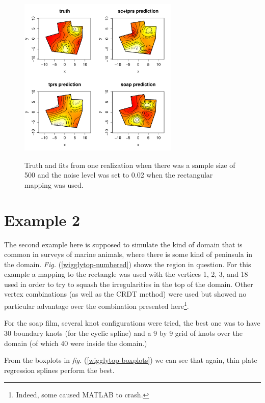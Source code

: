 \documentclass[a4paper,10pt]{amsart}
\newcommand{\fig}[1]{\emph{fig.} (\ref{#1})}
\newcommand{\Fig}[1]{\emph{Fig.} (\ref{#1})}
\begin{document}
\begin{figure}[tbp]
\centering
\includegraphics[width=3in]{figs-otherdomains/fig9-rect-real.pdf} \\
\caption{Truth and fits from one realization when there was a sample size of 500 and the noise level was set to 0.02 when the rectangular mapping was used. }
\label{fig9-rect-real}
\end{figure}




\section{Example 2}

The second example here is supposed to simulate the kind of domain that is common in surveys of marine animals, where there is some kind of peninsula in the domain. \Fig{wigglytop-numbered} shows the region in question. For this example a mapping to the rectangle was used with the vertices 1, 2, 3, and 18 used in order to try to squash the irregularities in the top of the domain. Other vertex combinations (as well as the CRDT method) were used but showed no particular advantage over the combination presented here\footnote{Indeed, some caused MATLAB to crash.}.

For the soap film, several knot configurations were tried, the best one was to have 30 boundary knots (for the cyclic spline) and a 9 by 9 grid of knots over the domain (of which 40 were inside the domain.) 

From the boxplots in \fig{wigglytop-boxplots} we can see that again, thin plate regression splines perform the best.
\end{document}
